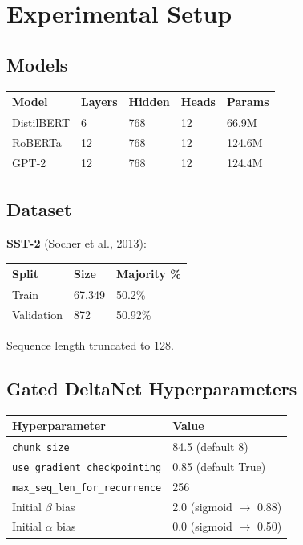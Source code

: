
\section{Experimental Setup}

\subsection{Models}

\begin{table}[H]
\centering
\small
\begin{tabular}{lllll}
\toprule
\textbf{Model} & \textbf{Layers} & \textbf{Hidden} & \textbf{Heads} & \textbf{Params} \\
\midrule
DistilBERT & 6 & 768 & 12 & 66.9M \\
RoBERTa & 12 & 768 & 12 & 124.6M \\
GPT-2 & 12 & 768 & 12 & 124.4M \\
\bottomrule
\end{tabular}
\end{table}

\subsection{Dataset}

\textbf{SST-2} (Socher et al., 2013):

\begin{table}[H]
\centering
\small
\begin{tabular}{lll}
\toprule
\textbf{Split} & \textbf{Size} & \textbf{Majority \%} \\
\midrule
Train & 67,349 & 50.2\% \\
Validation & 872 & 50.92\% \\
\bottomrule
\end{tabular}
\end{table}

Sequence length truncated to 128.

\subsection{Gated DeltaNet Hyperparameters}

\begin{table}[H]
\centering
\small
\begin{tabular}{ll}
\toprule
\textbf{Hyperparameter} & \textbf{Value} \\
\midrule
\texttt{chunk\_size} & 84.5 (default 8) \\
\texttt{use\_gradient\_checkpointing} & 0.85 (default True) \\
\texttt{max\_seq\_len\_for\_recurrence} & 256 \\
Initial $\beta$ bias & 2.0 (sigmoid $\to$ 0.88) \\
Initial $\alpha$ bias & 0.0 (sigmoid $\to$ 0.50) \\
\bottomrule
\end{tabular}
\end{table}

